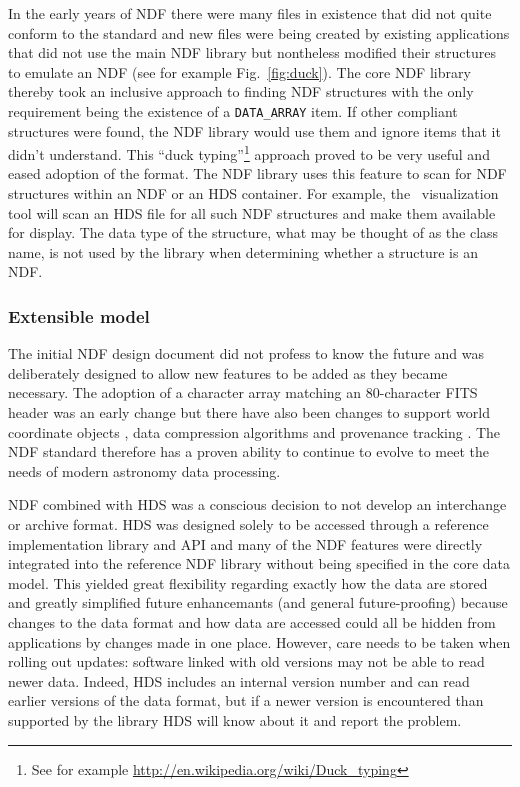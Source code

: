 \documentclass[final,authoryear,5p,times,twocolumn]{elsarticle}
\begin{document}
In the early years of NDF there were many files in existence that did
not quite conform to the standard and new files were being created by
existing applications that did not use the main NDF library but
nontheless modified their structures to emulate an NDF (see for
example Fig.\ \ref{fig:duck}). The core NDF library thereby took an
inclusive approach to finding NDF structures with the only requirement
being the existence of a \texttt{DATA\_ARRAY} item. If other compliant
structures were found, the NDF library would use them and ignore items
that it didn't understand. This ``duck typing''\footnote{See for
  example \url{http://en.wikipedia.org/wiki/Duck_typing}} approach
proved to be very useful and eased adoption of the format. The NDF
library uses this feature to scan for NDF structures within an NDF or
an HDS container. For example, the \gaia\ visualization tool \citep{2009ASPC..411..575D}
will scan an HDS file for all such NDF structures and make them
available for display. The data type of the structure, what may be
thought of as the class name, is not used by the library when
determining whether a structure is an NDF.

\subsubsection{Extensible model}

The initial NDF design document did not profess to know the future and
was deliberately designed to allow new features to be added as they
became necessary. The adoption of a character array matching an
80-character FITS header was an early change but there have also been
changes to support world coordinate objects
\citep{2001ASPC..238..129B}, data compression algorithms
\citep{2008ASPC..394..650C} and provenance tracking
\citep{2009ASPC..411..418J}. The NDF standard therefore has a proven
ability to continue to evolve
to meet the needs of modern astronomy data processing.

NDF combined with HDS was a conscious decision to not develop an
interchange or archive format. HDS was designed solely to be accessed
through a reference implementation library and API and many of the NDF
features were directly integrated into the reference NDF library without being
specified in the core data model.  This yielded great flexibility
regarding exactly how the data are stored and greatly simplified
future enhancemants (and general future-proofing) because changes to
the data format and how data are accessed could all be hidden from
applications by changes made in one place. However, care needs to be taken
when rolling out updates: software linked with old versions
may not be able to read newer data. Indeed, HDS includes an internal
version number and can read earlier versions of the data format, but if a
newer version is encountered than supported by the library HDS will
know about it and report the problem.
\end{document}
